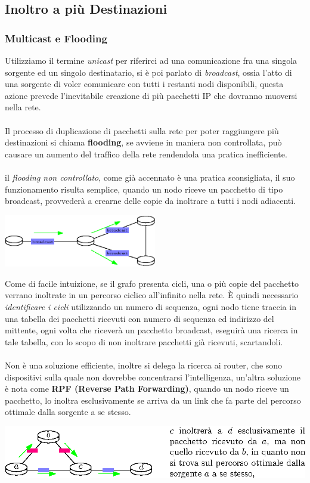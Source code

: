\documentclass[12pt, letterpaper]{article}
\newcommand{\acc}{\\\hphantom{}\\}
\begin{document}
\subsection{Inoltro a più Destinazioni}
\subsubsection{Multicast e Flooding}
Utilizziamo il termine \textit{unicast} per riferirci ad una comunicazione fra una singola sorgente ed un
singolo destinatario, si è poi parlato di \textit{broadcast}, ossia l'atto di una sorgente di voler comunicare con 
tutti i restanti nodi disponibili, questa azione prevede l'inevitabile creazione di più pacchetti IP che dovranno 
muoversi nella rete.\acc 
Il processo di duplicazione di pacchetti sulla rete per poter raggiungere più destinazioni si chiama \textbf{flooding}, 
se avviene in maniera non controllata, può causare un aumento del traffico della rete rendendola una 
pratica inefficiente.\acc 
il \textit{flooding non controllato}, come già accennato è una pratica sconsigliata, il suo funzionamento risulta 
semplice, quando un nodo riceve un pacchetto di tipo broadcast, provvederà a crearne delle copie da inoltrare a tutti 
i nodi adiacenti.\begin{center}
    \includegraphics[width=0.5\textwidth ]{images/UncontrolledFlooding.eps}
\end{center}
Come di facile intuizione, se il grafo presenta cicli, una o più copie del pacchetto verrano inoltrate in un percorso 
ciclico all'infinito nella rete. È quindi necessario \textit{identificare i cicli} utilizzando un numero di sequenza, 
ogni nodo tiene traccia in una tabella dei pacchetti ricevuti con numero di sequenza ed indirizzo del mittente, ogni volta 
che riceverà un pacchetto broadcast, eseguirà una ricerca in tale tabella, con lo scopo di non inoltrare pacchetti 
già ricevuti, scartandoli.\acc 
Non è una soluzione efficiente, inoltre si delega la ricerca ai router, che sono dispositivi sulla quale non dovrebbe 
concentrarsi l'intelligenza, un'altra soluzione è nota come \textbf{RPF (Reverse Path Forwarding)}, quando un nodo
riceve un pacchetto, lo inoltra esclusivamente se arriva da un link che fa parte del percorso ottimale dalla 
sorgente a se stesso.\begin{center}
    \includegraphics[width=\textwidth ]{images/RPF.eps}
\end{center} 
\end{document}
